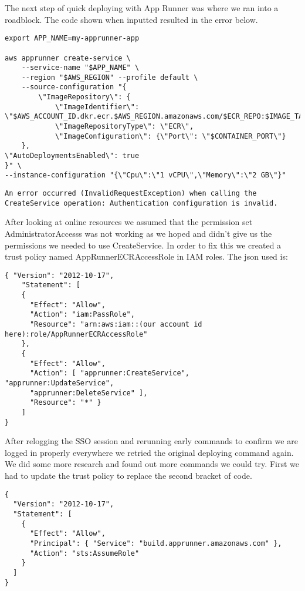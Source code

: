 \noindent The next step of quick deploying with App Runner was where we ran into a roadblock. The code shown when inputted resulted in the error below. 


\begin{verbatim}
export APP_NAME=my-apprunner-app

aws apprunner create-service \
    --service-name "$APP_NAME" \
    --region "$AWS_REGION" --profile default \
    --source-configuration "{
        \"ImageRepository\": {
            \"ImageIdentifier\": \"$AWS_ACCOUNT_ID.dkr.ecr.$AWS_REGION.amazonaws.com/$ECR_REPO:$IMAGE_TAG\",
            \"ImageRepositoryType\": \"ECR\",
            \"ImageConfiguration\": {\"Port\": \"$CONTAINER_PORT\"}
    },
\"AutoDeploymentsEnabled\": true
}" \
--instance-configuration "{\"Cpu\":\"1 vCPU\",\"Memory\":\"2 GB\"}"
\end{verbatim}

\begin{verbatim}
An error occurred (InvalidRequestException) when calling the CreateService operation: Authentication configuration is invalid.
\end{verbatim}

\noindent After looking at online resources we assumed that the permission set AdministratorAccesss was not working as we hoped and didn't give us the permissions we needed to use CreateService. In order to fix this we created a trust policy named AppRunnerECRAccessRole in IAM roles. The json used is:

\begin{verbatim}
{ "Version": "2012-10-17", 
    "Statement": [ 
    { 
      "Effect": "Allow", 
      "Action": "iam:PassRole", 
      "Resource": "arn:aws:iam::(our account id here):role/AppRunnerECRAccessRole" 
    }, 
    { 
      "Effect": "Allow", 
      "Action": [ "apprunner:CreateService", "apprunner:UpdateService", 
      "apprunner:DeleteService" ], 
      "Resource": "*" } 
    ] 
}

\end{verbatim}

\noindent After relogging the SSO session and rerunning early commands to confirm we are logged in properly everywhere we retried the original deploying command again. We did some more research and found out more commands we could try. First we had to update the trust policy to replace the second bracket of code. 

\begin{verbatim}
{
  "Version": "2012-10-17",
  "Statement": [
    {
      "Effect": "Allow",
      "Principal": { "Service": "build.apprunner.amazonaws.com" },
      "Action": "sts:AssumeRole"
    }
  ]
}

\end{verbatim}

